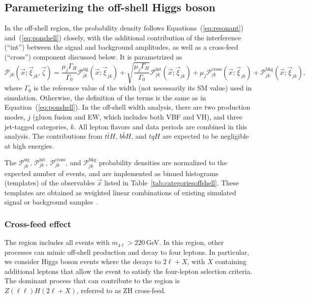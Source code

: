 \subsection{Parameterizing the off-shell Higgs boson} \label{physicsmodel}

In the off-shell region, the probability density follows Equations~(\ref{eq:resonant}) and~(\ref{eq:ponshell}) closely,
with the additional contribution of the interference (``int'') between the signal and background amplitudes,
as well as a cross-feed (``cross'') component discussed below. It is parametrized as 
\begin{equation}\label{eq:poffshell}
    \mathcal{P}_{jk}(\vec{x};\vec{\xi}_{jk},\vec\zeta) =
    \frac{\mu_j \Gamma_H}{\Gamma_0}\mathcal{P}_{jk}^\text{sig} ( \vec{x};\vec{\xi}_{jk})
    + \sqrt{\frac{\mu_j \Gamma_H}{\Gamma_0}}\mathcal{P}_{jk}^\mathrm{int} ( \vec{x};\vec{\xi}_{jk})
    + \mu_j\mathcal{P}_{jk}^\text{cross} (\vec{x};\vec{\xi}_{jk})
    + \mathcal{P}_{jk}^\text{bkg} ( \vec{x};\vec{\xi}_{jk}),
\end{equation}
where $\Gamma_0$ is the reference value of the \Hboson width (not necessarily its SM value)
used in simulation. Otherwise, the definition of the terms is the same as in Equation~(\ref{eq:ponshell}). 
In the off-shell width analysis, there are two production modes, $j$ (gluon fusion and EW, which includes both VBF and VH), 
and three jet-tagged categories, $k$. All lepton flavors and data periods are combined in this analysis.
The contributions from $t\bar{t}H$, $b\bar{b}H$, and $tqH$ are expected to be negligible at high energies.

The $\mathcal{P}_{jk}^{\text{sig}}$, $\mathcal{P}_{jk}^{\text{int}}$, $\mathcal{P}_{jk}^{\text{cross}}$, and $\mathcal{P}_{jk}^\text{bkg}$ probability densities are normalized to the expected number of events, and are implemented as binned histograms (templates) of the observables $\vec{x}$ listed in Table~\ref{tab:categoriesoffshell}. These templates are obtained as weighted linear combinations of existing simulated signal or background samples~\cite{PhysRevD.111.092014}.

\subsubsection{Cross-feed effect}

The \offshell region includes all events with $m_{4\ell} > 220$\,GeV. In this region, other processes can mimic off-shell \Hboson production and decay to four leptons. In particular, we consider \onshell Higgs boson events where the \Hboson decays to $2\ell + X$, with $X$ containing additional leptons that allow the event to satisfy the four-lepton selection criteria. The dominant \onshell \Hboson process that can contribute to the \offshell region is $Z(\ell\ell)H(2\ell + X)$, referred to as ZH cross-feed.


